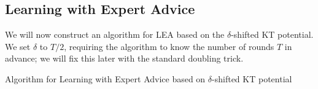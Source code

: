 \subsection{Learning with Expert Advice}
\label{section:kt-lea}

We will now construct an algorithm for \ac{LEA} based on the $\delta$-shifted
KT potential. We set $\delta$ to $T/2$, requiring the algorithm to know the
number of rounds $T$ in advance; we will fix this later with the standard
doubling trick.

\begin{algorithm}[t]
\begin{algorithmic}[1]
\caption{Algorithm for Learning with Expert Advice based on $\delta$-shifted KT potential
\label{algorithm:kt-experts}}
{
\ENDFOR
}
\end{algorithmic}
\end{algorithm}

